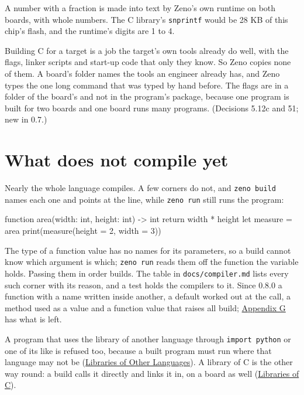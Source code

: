 A number with a fraction is made into text by Zeno's own runtime on
both boards, with whole numbers. The C library's \verb|snprintf| would
be 28 KB of this chip's flash, and the runtime's digits are 1 to 4.

\begin{why}
Building C for a target is a job the target's own tools already do
well, with the flags, linker scripts and start-up code that only they
know. So Zeno copies none of them. A board's folder names the tools an
engineer already has, and Zeno types the one long command that was
typed by hand before. The flags are in a folder of the board's and not
in the program's package, because one program is built for two boards
and one board runs many programs. (Decisions 5.12c and 51; new in
0.7.)
\end{why}

\section{What does not compile yet}

Nearly the whole language compiles. A few corners do not, and
\verb|zeno build| names each one and points at the line, while
\verb|zeno run| still runs the program:

\begin{zeno}[file=named.zeno, cmd=zeno build {file}, fails=yes]
function area(width: int, height: int) -> int {
    return width * height
}
let measure = area
print(measure(height = 2, width = 3))
\end{zeno}

The type of a function value has no names for its parameters, so a
build cannot know which argument is which; \verb|zeno run| reads them
off the function the variable holds. Passing them in order builds.
The table in \verb|docs/compiler.md| lists every such corner with its
reason, and a test holds the compilers to it. Since 0.8.0 a function
with a name written inside another, a default worked out at the call,
a method used as a value and a function value that raises all build;
\hyperref[app-limits]{Appendix G} has what is left.

A program that uses the library of another language through
\verb|import python| or one of its like is refused too, because a
built program must run where that language may not be
(\hyperref[ch-other-languages]{Libraries of Other Languages}). A
library of C is the other way round: a build calls it directly and
links it in, on a board as well (\hyperref[ch-c-libraries]{Libraries
of C}).

